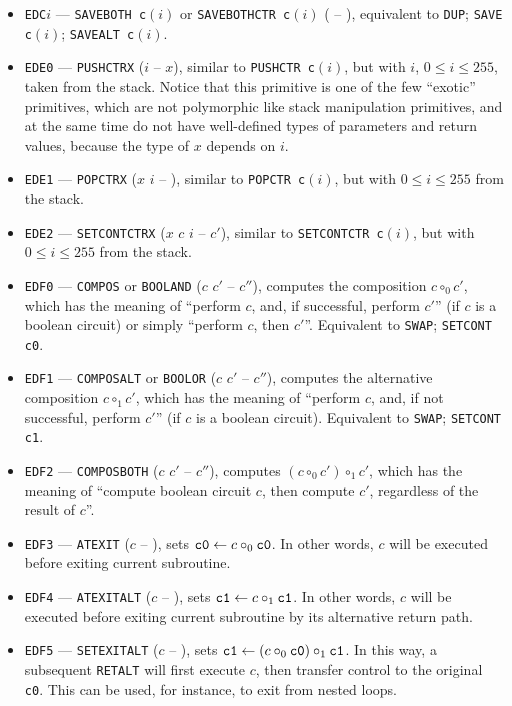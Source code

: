 \documentclass[12pt,oneside]{article}
\begin{document}
\begin{itemize}
\item {\tt EDC$i$} --- {\tt SAVEBOTH c$(i)$} or {\tt SAVEBOTHCTR c$(i)$} ( -- ), equivalent to {\tt DUP}; {\tt SAVE c$(i)$}; {\tt SAVEALT c$(i)$}.
\item {\tt EDE0} --- {\tt PUSHCTRX} ($i$ -- $x$), similar to {\tt PUSHCTR c$(i)$}, but with $i$, $0\leq i\leq255$, taken from the stack. Notice that this primitive is one of the few ``exotic'' primitives, which are not polymorphic like stack manipulation primitives, and at the same time do not have well-defined types of parameters and return values, because the type of $x$ depends on $i$.
\item {\tt EDE1} --- {\tt POPCTRX} ($x$ $i$ -- ), similar to {\tt POPCTR c$(i)$}, but with $0\leq i\leq255$ from the stack.
\item {\tt EDE2} --- {\tt SETCONTCTRX} ($x$ $c$ $i$ -- $c'$), similar to {\tt SETCONTCTR c$(i)$}, but with $0\leq i\leq 255$ from the stack.
\item {\tt EDF0} --- {\tt COMPOS} or {\tt BOOLAND} ($c$ $c'$ -- $c''$), computes the composition $c\circ_0c'$, which has the meaning of ``perform $c$, and, if successful, perform $c'$'' (if $c$ is a boolean circuit) or simply ``perform $c$, then $c'$''. Equivalent to {\tt SWAP}; {\tt SETCONT c0}.
\item {\tt EDF1} --- {\tt COMPOSALT} or {\tt BOOLOR} ($c$ $c'$ -- $c''$), computes the alternative composition $c\circ_1 c'$, which has the meaning of ``perform $c$, and, if not successful, perform $c'$'' (if $c$ is a boolean circuit). Equivalent to {\tt SWAP}; {\tt SETCONT c1}.
\item {\tt EDF2} --- {\tt COMPOSBOTH} ($c$ $c'$ -- $c''$), computes $(c\circ_0c')\circ_1c'$, which has the meaning of ``compute boolean circuit $c$, then compute $c'$, regardless of the result of $c$''.
\item {\tt EDF3} --- {\tt ATEXIT} ($c$ -- ), sets ${\tt c0}\leftarrow c\circ_0{\tt c0}$. In other words, $c$ will be executed before exiting current subroutine.
\item {\tt EDF4} --- {\tt ATEXITALT} ($c$ -- ), sets ${\tt c1}\leftarrow c\circ_1{\tt c1}$. In other words, $c$ will be executed before exiting current subroutine by its alternative return path.
\item {\tt EDF5} --- {\tt SETEXITALT} ($c$ -- ), sets ${\tt c1}\leftarrow (c\circ_0{\tt c0})\circ_1{\tt c1}$. In this way, a subsequent {\tt RETALT} will first execute $c$, then transfer control to the original {\tt c0}. This can be used, for instance, to exit from nested loops.

\end{itemize}
\end{document}
